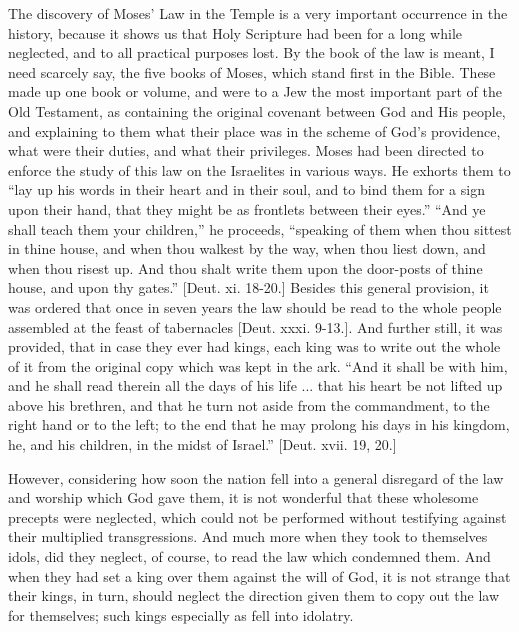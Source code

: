The discovery of Moses' Law in the Temple is a very important
occurrence in the history, because it shows us that Holy Scripture had
been for a long while neglected, and to all practical purposes lost.
By the book of the law is meant, I need scarcely say, the five books
of Moses, which stand first in the Bible. These made up one book or
volume, and were to a Jew the most important part of the Old
Testament, as containing the original covenant between God and His
people, and explaining to them what their place was in the scheme of
God's providence, what were their duties, and what their privileges.
Moses had been directed to enforce the study of this law on the
Israelites in various ways. He exhorts them to ``lay up his words
in their heart and in their soul, and to bind them for a sign upon
their hand, that they might be as frontlets between their eyes.''
``And ye shall teach them your children,'' he proceeds, ``speaking of them when thou sittest in thine house, and when thou
walkest by the way, when thou liest down, and when thou risest up. And
thou shalt write them upon the door-posts of thine house, and upon thy
gates.'' [Deut. xi. 18-20.] Besides this general provision, it was
ordered that once in seven years the law should be read to the whole
people assembled at the feast of tabernacles [Deut. xxxi. 9-13.]. And
further still, it was provided, that in case they ever had kings, each
king was to write out the whole of it from the original copy which was
kept in the ark. ``And it shall be with him, and he shall read
therein all the days of his life ... that his heart be not lifted up
above his brethren, and that he turn not aside from the commandment,
to the right hand or to the left; to the end that he may prolong his
days in his kingdom, he, and his children, in the midst of
Israel.'' [Deut. xvii. 19, 20.]

However, considering how soon the nation fell into a general
disregard of the law and worship which God gave them, it is not
wonderful that these wholesome precepts were neglected, which could
not be performed without testifying against their multiplied
transgressions. And much more when they took to themselves idols, did
they neglect, of course, to read the law which condemned them. And
when they had set a king over them against the will of God, it is not
strange that their kings, in turn, should neglect the direction given
them to copy out the law for themselves; such kings especially as fell
into idolatry.

